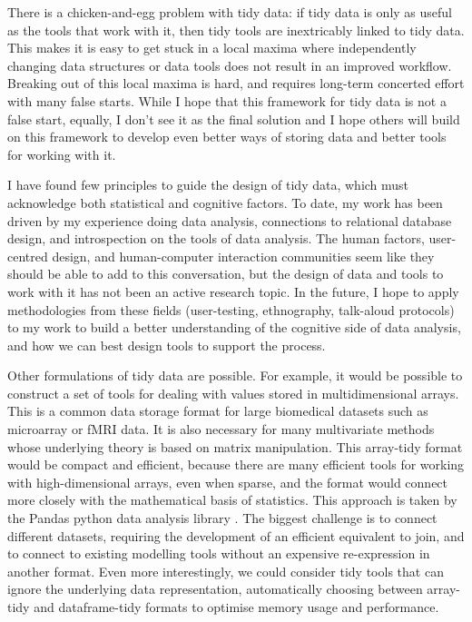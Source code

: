 \documentclass[article]{jss}
\begin{document}
There is a chicken-and-egg problem with tidy data: if tidy data is only as useful as the tools that work with it, then tidy tools are inextricably linked to tidy data. This makes it is easy to get stuck in a local maxima where independently changing data structures or data tools does not result in an improved workflow. Breaking out of this local maxima is hard, and requires long-term concerted effort with many false starts. While I hope that this framework for tidy data is not a false start, equally, I don't see it as the final solution and I hope others will build on this framework to develop even better ways of storing data and better tools for working with it.

I have found few principles to guide the design of tidy data, which must acknowledge both statistical and cognitive factors. To date, my work has been driven by my experience doing data analysis, connections to relational database design, and introspection on the tools of data analysis. The human factors, user-centred design, and human-computer interaction communities seem like they should be able to add to this conversation, but the design of data and tools to work with it has not been an active research topic. In the future, I hope to apply methodologies from these fields (user-testing, ethnography, talk-aloud protocols) to my work to build a better understanding of the cognitive side of data analysis, and how we can best design tools to support the process.


Other formulations of tidy data are possible. For example, it would be possible to construct a set of tools for dealing with values stored in multidimensional arrays. This is a common data storage format for large biomedical datasets such as microarray or fMRI data. It is also necessary for many multivariate methods whose underlying theory is based on matrix manipulation. This array-tidy format would be compact and efficient, because there are many efficient tools for working with high-dimensional arrays, even when sparse, and the format would connect more closely with the mathematical basis of statistics. This approach is taken by the Pandas python data analysis library \citep{mckinney:2010}. The biggest challenge is to connect different datasets, requiring the development of an efficient equivalent to join, and to connect to existing modelling tools without an expensive re-expression in another format. Even more interestingly, we could consider tidy tools that can ignore the underlying data representation, automatically choosing between array-tidy and dataframe-tidy formats to optimise memory usage and performance.
\end{document}
